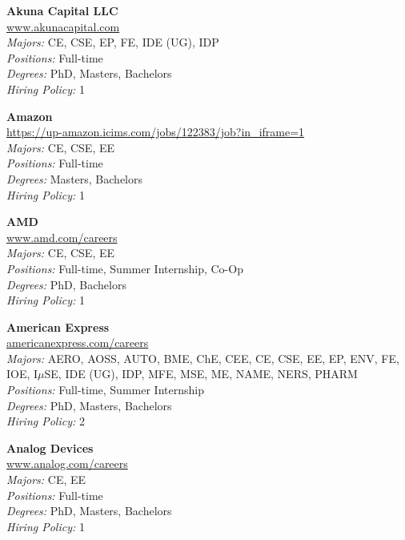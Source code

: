 \documentclass[twoside]{article}
\begin{document}
\begin{center}
\begin{multicols}{3}
\begin{minipage}{.9\columnwidth}{\Large\bf Akuna Capital LLC }\\
	\url{www.akunacapital.com}\\
	\emph{Majors:} CE, CSE, EP, FE, IDE (UG), IDP\\
	\emph{Positions:} Full-time\\
	\emph{Degrees:} PhD, Masters, Bachelors\\
	\emph{Hiring Policy:} 1\\
\end{minipage}
 
\begin{minipage}{.9\columnwidth}{\Large\bf Amazon }\\
	\url{https://up-amazon.icims.com/jobs/122383/job?in_iframe=1}\\
	\emph{Majors:} CE, CSE, EE\\
	\emph{Positions:} Full-time\\
	\emph{Degrees:} Masters, Bachelors\\
	\emph{Hiring Policy:} 1\\
\end{minipage}
 
\begin{minipage}{.9\columnwidth}{\Large\bf AMD }\\
	\url{www.amd.com/careers}\\
	\emph{Majors:} CE, CSE, EE\\
	\emph{Positions:} Full-time, Summer Internship, Co-Op\\
	\emph{Degrees:} PhD, Bachelors\\
	\emph{Hiring Policy:} 1\\
\end{minipage}
 
\begin{minipage}{.9\columnwidth}{\Large\bf American Express }\\
	\url{americanexpress.com/careers}\\
	\emph{Majors:} AERO, AOSS, AUTO, BME, ChE, CEE, CE, CSE, EE, EP, ENV, FE, IOE, I$\mu$SE, IDE (UG), IDP, MFE, MSE, ME, NAME, NERS, PHARM\\
	\emph{Positions:} Full-time, Summer Internship\\
	\emph{Degrees:} PhD, Masters, Bachelors\\
	\emph{Hiring Policy:} 2\\
\end{minipage}
 
\begin{minipage}{.9\columnwidth}{\Large\bf Analog Devices }\\
	\url{www.analog.com/careers}\\
	\emph{Majors:} CE, EE\\
	\emph{Positions:} Full-time\\
	\emph{Degrees:} PhD, Masters, Bachelors\\
	\emph{Hiring Policy:} 1\\
\end{minipage}
 

\end{multicols}
\end{center}
\end{document}
